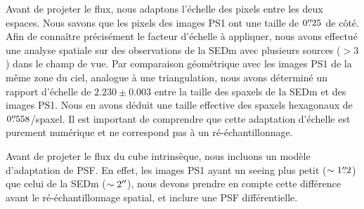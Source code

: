 \documentclass[../main/main.tex]{subfiles}
\begin{document}
Avant de projeter le flux, nous adaptons l'échelle des pixels entre les
deux espaces. Nous savons que les pixels des images PS1 ont une taille
de $0\overset{\prime\prime}{.}25$ de côté. Afin de connaître précisément le facteur
d'échelle à appliquer, nous avons effectué une analyse spatiale sur des
observations de la SEDm avec plusieurs sources ($>3$) dans le
champ de vue. Par comparaison géométrique avec les images PS1 de la même
zone du ciel, analogue à une triangulation, nous avons déterminé un
rapport d'échelle de $2.230\pm0.003$ entre la taille des spaxels de la
SEDm et des images PS1. Nous en avons déduit une taille effective des
spaxels hexagonaux de $0\overset{\prime\prime}{.}558$/spaxel. Il est important de
comprendre que cette adaptation d'échelle est purement numérique et ne correspond pas à
un ré-échantillonnage.

Avant de projeter le flux du cube intrinsèque, nous incluons un modèle
d'adaptation de PSF. En effet, les images PS1 ayant un seeing plus
petit ($\sim1\overset{\prime\prime}{.}2$) que celui de la SEDm ($\sim2^{\prime\prime}$), nous
devons prendre en compte cette différence avant le ré-échantillonnage
spatial, et inclure une PSF différentielle.
\end{document}
